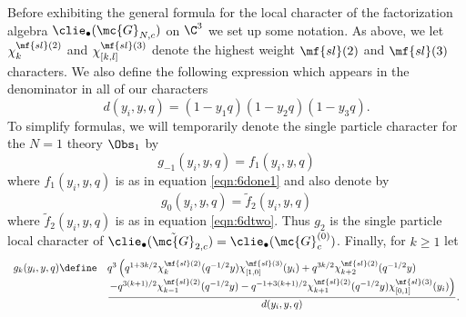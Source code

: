 Before exhibiting the general formula for the local character of the factorization algebra $\clie_\bullet(\mc{G}_{N,c})$ on $\C^3$ we set up some notation. 
As above, we let $\chi_k^{\mf{sl}(2)}$ and $\chi^{\mf{sl}(3)}_{[k,l]}$ denote the highest weight $\mf{sl}(2)$ and $\mf{sl}(3)$ characters. 
We also define the following expression which appears in the denominator in all of our characters
\begin{equation}
d(y_i,y,q) = (1-y_1 q)(1-y_2q)(1-y_3q) .
\end{equation} 
To simplify formulas, we will temporarily denote the single particle character for the $N=1$ theory $\Obs_1$ by 
\begin{equation}
g_{-1} (y_i,y,q) = f_1(y_i,y,q)
\end{equation}
where $f_1(y_i,y,q)$ is as in equation \eqref{eqn:6done1} and also denote by 
\begin{equation}
g_0 (y_i,y,q) = \tilde f_2(y_i,y,q)
\end{equation}
where $\tilde f_2(y_i,y,q)$ is as in equation \eqref{eqn:6dtwo}. 
Thus $g_2$ is the single particle local character of $\clie_\bullet(\tilde {\mc{G}}_{2,c}) = \clie_{\bullet}(\mc{G}_c^{(0)})$.
Finally, for $k \geq 1$ let
\begin{equation}
\label{eqn:gk}
\begin{array}{lllll}
g_k (y_i,y,q) \define & q^{3} \left(q^{1 + 3 k/2} \chi^{\mf{sl}(2)}_{k}(q^{-1/2} y)\chi^{\mf{sl}(3)}_{[1,0]}(y_i) + q^{3k/2} \chi^{\mf{sl}(2)}_{k+2}(q^{-1/2} y) \right. \\
&\displaystyle \frac{\left.  - q^{3(k+1)/2} \chi^{\mf{sl}(2)}_{k-1}(q^{-1/2}y) - q^{-1 + 3(k+1)/2} \chi^{\mf{sl}(2)}_{k+1} (q^{-1/2} y) \chi^{\mf{sl}(3)}_{[0,1]}(y_i) \right)}{d(y_i,y,q)} .
\end{array}
\end{equation}

